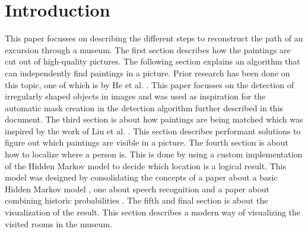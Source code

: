 \section*{Introduction}

This paper focusses on describing the different steps to reconstruct the path of an excursion through a museum. The first section describes how the paintings are cut out of high-quality pictures. The following section explains an algorithm that can independently find paintings in a picture. Prior research has been done on this topic, one of which is by He et al. \cite{he2019scan}. This paper focusses on the detection of irregularly shaped objects in images and was used as inspiration for the automatic mask creation in the detection algorithm further described in this document. The third section is about how paintings are being matched which was inspired by the work of Liu et al. \cite{liu2020image}. This section describes performant solutions to figure out which paintings are visible in a picture. The fourth section is about how to localize where a person is. This is done by using a custom implementation of the Hidden Markov model to decide which location is a logical result. This model was designed by consolidating the concepts of a paper about a basic Hidden Markov model \cite{eddy1996hidden}, one about speech recognition \cite{juang1991hidden} and a paper about combining historic probabilities \cite{genest1986combining}. The fifth and final section is about the visualization of the result. This section describes a modern way of visualizing the visited rooms in the museum.
